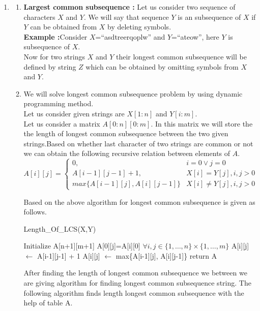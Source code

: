 \documentclass[12pt,a4paper,final]{article}
\theoremstyle{definition}
\begin{document}
\begin{enumerate}
\item

\begin{enumerate}

\item
\textbf{Largest common subsequence :} Let us consider two sequence of characters $X$ and $Y$. We will say that sequence $Y$ is an subsequence of $X$ if $Y$ can be obtained from $X$ by deleting symbols. \\
\textbf{Example :}Consider $X$=``asdtreerqoplw'' and $Y$=``ateow'', here $Y$ is subsequence of $X$.\\
Now for two strings  $X$ and $Y$ their longest common subsequence will be defined by string $Z$ which can be obtained by omitting symbols from $X$ and $Y$.


\item 
We will solve longest common subsequence problem by using dynamic programming method.\\
Let us consider given strings are $X[1:n]$ and $Y[i:m]$.\\
Let us consider a matrix $A[0:n][0:m]$. In this matrix we will store the the length of longest common subsequence between the two given strings.Based on whether last character of two strings are common or not we can obtain the following recursive relation between elements of $A$.
\[
  A[i][j] =
  \begin{cases}
                      0, & i=0 \lor j=0 \\
                      A[i-1][j-1] + 1,  & X[i]=Y[j],i,j > 0\\
                      max\{A[i-1][j], A[i][j-1]\} & X[i] \neq Y[j],i,j > 0
  \end{cases}
\]

Based on the above algorithm for longest common subsequence is given as follows.
\begin{algorithm}[H]
\caption{Length\_Of\_LCS(X,Y)}
\begin{algorithmic}[1]
\State Initialize A[n+1][m+1]
\State A[0][j]=A[i][0] $\forall i,j \in \{1,\dots,n\} \times \{1,\dots,m\}$
		  		\State A[i][j] $\gets$ A[i-1][j-1] + 1
		  \Else
		  		\State A[i][j] $\gets$ max\{A[i-1][j], A[i][j-1]\}
		  \EndIf
	\EndFor
\EndFor
\State return A
\end{algorithmic}
\end{algorithm}

After finding the length of longest common subsequence we  between we are giving algorithm for finding longest common subsequence string. The following algorithm finds length longest common subsequence with the help of table A.


\end{enumerate}
\end{enumerate}
\end{document}
